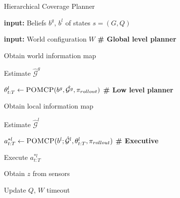 



\begin{algorithm}[t!]
\caption{Hierarchical Coverage Planner}
\label{alg:hierarchicalPlanner}
\begin{multicols}{2}
\begin{algorithmic}
\STATE {}
\item \textbf{input: }Beliefs $b^g$, $b^l$ of states $s=(G, Q)$
\item \textbf{input: }World configuration $W$
\REPEAT
    \STATE \textbf{\# Global level planner}
    \item  Obtain world information map
    \item Estimate $\hat{\mathcal{G}}^g$
    \item $\theta^l_{t:T} \gets \textsc{POMCP}(b^g, \hat{\mathcal{G}^g}, \pi_{rollout})$
    \STATE \textbf{\# Low level planner}
    \item Obtain local information map
    \item Estimate $\hat{\mathcal{G}}^l$
    \item $a_{t:T}^{*l} \gets \textsc{POMCP}(b^l;\hat{\mathcal{G}}^l, \theta^l_{t:T}, \pi_{rollout})$ 
    \STATE \textbf{\# Executive}
    \item Execute $a_{t:T}^{*l}$
    \item Obtain $z$ from sensors
    \item Update $Q$, $W$
\UNTIL timeout
\end{algorithmic}


\end{multicols}
\end{algorithm}
